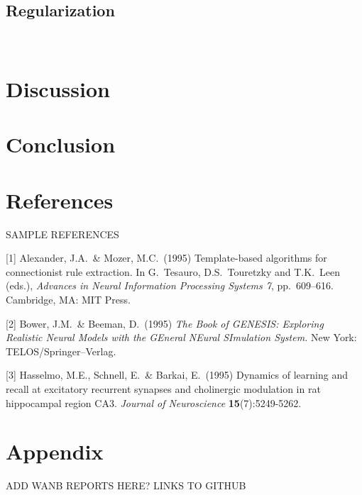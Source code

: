 \documentclass{article}
\begin{document}
\subsection{Regularization}

\
\section{Discussion}
\section{Conclusion}
\section*{References}

\medskip

{
\small

SAMPLE REFERENCES

[1] Alexander, J.A.\ \& Mozer, M.C.\ (1995) Template-based algorithms for
connectionist rule extraction. In G.\ Tesauro, D.S.\ Touretzky and T.K.\ Leen
(eds.), {\it Advances in Neural Information Processing Systems 7},
pp.\ 609--616. Cambridge, MA: MIT Press.

[2] Bower, J.M.\ \& Beeman, D.\ (1995) {\it The Book of GENESIS: Exploring
  Realistic Neural Models with the GEneral NEural SImulation System.}  New York:
TELOS/Springer--Verlag.

[3] Hasselmo, M.E., Schnell, E.\ \& Barkai, E.\ (1995) Dynamics of learning and
recall at excitatory recurrent synapses and cholinergic modulation in rat
hippocampal region CA3. {\it Journal of Neuroscience} {\bf 15}(7):5249-5262.
}


\appendix

\section{Appendix}

ADD WANB REPORTS HERE? LINKS TO GITHUB
\end{document}

